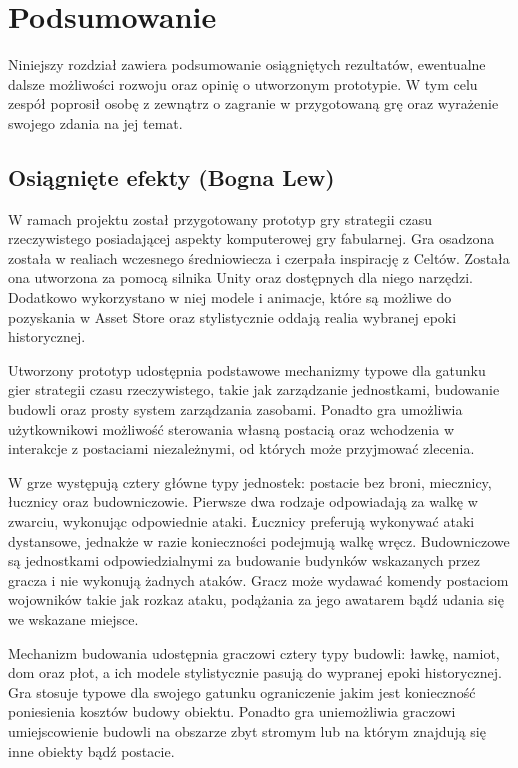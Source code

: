\chapter{Podsumowanie}\label{chap:summary}
Niniejszy rozdział zawiera podsumowanie osiągniętych rezultatów, ewentualne dalsze możliwości rozwoju oraz opinię o
utworzonym prototypie. W tym celu zespół poprosił osobę z zewnątrz o zagranie w przygotowaną grę oraz wyrażenie swojego
zdania na jej temat.

\section{Osiągnięte efekty (Bogna Lew)}\label{s:efekty}
W ramach projektu został przygotowany prototyp gry strategii czasu rzeczywistego posiadającej aspekty komputerowej gry
fabularnej. Gra osadzona została w realiach wczesnego średniowiecza i czerpała inspirację z Celtów. Została ona
utworzona za pomocą silnika Unity oraz dostępnych dla niego narzędzi. Dodatkowo wykorzystano w niej modele i animacje,
które są możliwe do pozyskania w Asset Store oraz stylistycznie oddają realia wybranej epoki historycznej.

Utworzony prototyp udostępnia podstawowe mechanizmy typowe dla gatunku gier strategii czasu rzeczywistego, takie jak
zarządzanie jednostkami, budowanie budowli oraz prosty system zarządzania zasobami. Ponadto gra umożliwia użytkownikowi
możliwość sterowania własną postacią oraz wchodzenia w interakcje z postaciami niezależnymi, od których może przyjmować
zlecenia.

W grze występują cztery główne typy jednostek: postacie bez broni, miecznicy, łucznicy oraz budowniczowie. Pierwsze dwa
rodzaje odpowiadają za walkę w zwarciu, wykonując odpowiednie ataki. Łucznicy preferują wykonywać ataki dystansowe,
jednakże w razie konieczności podejmują walkę wręcz. Budowniczowe są jednostkami odpowiedzialnymi za budowanie budynków
wskazanych przez gracza i nie wykonują żadnych ataków. Gracz może wydawać komendy postaciom wojowników takie jak rozkaz
ataku, podążania za jego awatarem bądź udania się we wskazane miejsce.

Mechanizm budowania udostępnia graczowi cztery typy budowli: ławkę, namiot, dom oraz płot, a ich modele stylistycznie
pasują do wypranej epoki historycznej. Gra stosuje typowe dla swojego gatunku ograniczenie jakim jest konieczność
poniesienia kosztów budowy obiektu. Ponadto gra uniemożliwia graczowi umiejscowienie budowli na obszarze zbyt stromym
lub na którym znajdują się inne obiekty bądź postacie.

